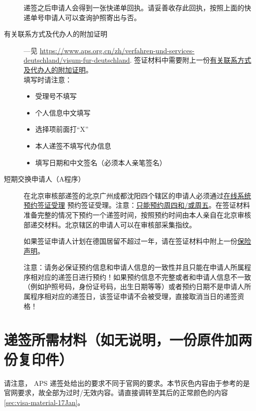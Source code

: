 \documentclass[final]{book}
\begin{document}
\begin{description}
递签之后申请人会得到一张快递单回执。请妥善收存此回执，按照上面的快递单号申请人可以查询护照寄出与否。
\item[有关联系方式及代办人的附加证明\label{inline-additional-proof}] ---见 \url{https://www.aps.org.cn/zh/verfahren-und-services-deutschland/visum-fur-deutschland}.
签证材料中需要附上一份\href{https://china.diplo.de/blob/1341728/895a5533a3c35c4fd2fbc21e92d6dfa3/pdf-formular-zusatzerklaerung-erreichbarkeit-data.pdf}{有关联系方式及代办人的附加证明}。\\
填写时请注意：
\begin{itemize}
  \item 受理号不填写
  \item 个人信息中文填写
  \item 选择项前面打“X”
  \item 本人递签不填写代办信息
  \item 填写日期和中文签名（必须本人亲笔签名）
\end{itemize}
\item[短期交换申请人（A程序）]
在北京审核部递签的北京广州成都沈阳四个辖区的申请人必须通过\href{https://service2.diplo.de/rktermin/extern/choose_category.do?locationCode=peki&realmId=12&categoryId=156&request_locale=de}{在线系统预约签证受理} 预约签证受理。注意：\underline{只能预约周四和/或周五}。在签证材料准备完整的情况下预约一个递签时间，按照预约时间由本人亲自在北京审核部递交材料。北京辖区的申请人可以在审核部采集指纹。

如果签证申请人计划在德国居留不超过一年，请在签证材料中附上一份\href{https://www.aps.org.cn/wp-content/uploads/Belehrung_KV.pdf}{保险声明}。

注意：请务必保证预约信息和申请人信息的一致性并且只能在申请人所属程序相对应的递签日进行预约！如果预约信息不完整或者和申请人信息不一致（例如护照号码，身份证号码，出生日期等等）或者预约日期不是申请人所属程序相对应的递签日，该签证申请不会被受理，直接取消当日的递签资格！
\end{description}


\section{递签所需材料（如无说明，一份原件加两份复印件）}\label{sec:visa-material}
请注意， APS 递签处给出的要求不同于官网的要求。本节灰色内容由于参考的是官网要求，故全部为过时/无效内容。请直接调转至其后的正常颜色的内容 \ref{sec:visa-material-17Jan}。
\end{document}
